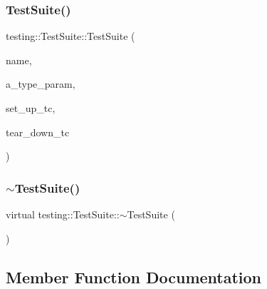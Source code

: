 \subsubsection{\texorpdfstring{TestSuite()}{TestSuite()}\hspace{0.1cm}{\footnotesize\ttfamily [2/2]}}
{\footnotesize\ttfamily testing\+::\+Test\+Suite\+::\+Test\+Suite (\begin{DoxyParamCaption}\item[{const char $\ast$}]{name,  }\item[{const char $\ast$}]{a\+\_\+type\+\_\+param,  }\item[{\mbox{\hyperlink{namespacetesting_1_1internal_a028e9455ad22171feabf84fe46329c92}{internal\+::\+Set\+Up\+Test\+Suite\+Func}}}]{set\+\_\+up\+\_\+tc,  }\item[{\mbox{\hyperlink{namespacetesting_1_1internal_ab58aba5acd47d329b72a1d10c7b61648}{internal\+::\+Tear\+Down\+Test\+Suite\+Func}}}]{tear\+\_\+down\+\_\+tc }\end{DoxyParamCaption})}

\mbox{\label{classtesting_1_1_test_suite_a78af2d96b44c8b8f2002b4e74df31c38}} 
\subsubsection{\texorpdfstring{$\sim$TestSuite()}{~TestSuite()}\hspace{0.1cm}{\footnotesize\ttfamily [2/2]}}
{\footnotesize\ttfamily virtual testing\+::\+Test\+Suite\+::$\sim$\+Test\+Suite (\begin{DoxyParamCaption}{ }\end{DoxyParamCaption})\hspace{0.3cm}{\ttfamily [virtual]}}



\subsection{Member Function Documentation}
\mbox{\label{classtesting_1_1_test_suite_a3391a0ec111c66e1ac16a800f5068af7}} 
